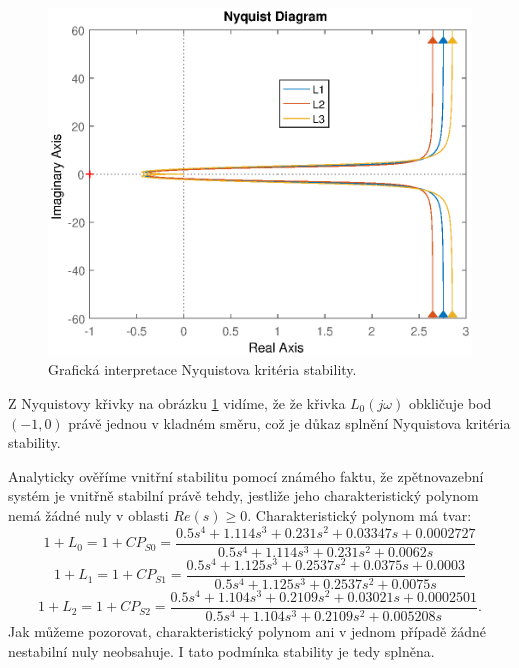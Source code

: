 \documentclass[a4paper,11pt]{article}
\begin{document}
\begin{figure}[htbp]
	\begin{center}
	\includegraphics[scale = 1.0]{obrazky/nyquist.eps}
	\caption{Grafická interpretace Nyquistova kritéria stability.}
	\label{fig:Nyquistovo_kriterium_stability}
	\end{center}
\end{figure}

Z Nyquistovy křivky na obrázku \ref{fig:Nyquistovo_kriterium_stability} vidíme, že že křivka $ L_{0}\left ( j\omega \right )  $ obkličuje bod $ \left ( -1,0 \right ) $ právě jednou v kladném směru, což je důkaz splnění Nyquistova kritéria stability.


\newpage 
Analyticky ověříme vnitřní stabilitu pomocí známého faktu, že zpětnovazební systém je vnitřně stabilní právě tehdy, jestliže jeho charakteristický polynom nemá žádné nuly v oblasti $ Re\left ( s \right )\geq 0. $
Charakteristický polynom má tvar:
\begin{equation}
1+L_{0}=1+CP_{S0}=\frac{0.5 s^4 + 1.114 s^3 + 0.231 s^2 + 0.03347 s + 0.0002727}{ 0.5 s^4 + 1.114 s^3 + 0.231 s^2 + 0.0062 s}
\end{equation}
\begin{equation}
1+L_{1}=1+CP_{S1}=\frac{0.5 s^4 + 1.125 s^3 + 0.2537 s^2 + 0.0375 s + 0.0003}{0.5 s^4 + 1.125 s^3 + 0.2537 s^2 + 0.0075 s}
\end{equation}
\begin{equation}
1+L_{2}=1+CP_{S2}=\frac{0.5 s^4 + 1.104 s^3 + 0.2109 s^2 + 0.03021 s + 0.0002501}{0.5 s^4 + 1.104 s^3 + 0.2109 s^2 + 0.005208 s}.
\end{equation}
Jak můžeme pozorovat, charakteristický polynom ani v jednom případě žádné nestabilní nuly neobsahuje. I tato podmínka stability je tedy splněna.
\end{document}
